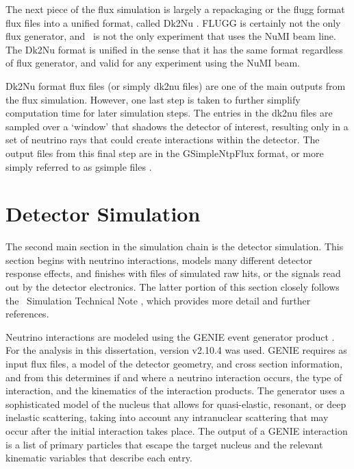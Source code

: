 The next piece of the flux simulation is largely a repackaging or the flugg format flux files into a unified format, called Dk2Nu \cite{ref:Dk2Nu}. FLUGG is certainly not the only flux generator, and \nova~is not the only experiment that uses the NuMI beam line. The Dk2Nu format is unified in the sense that it has the same format regardless of flux generator, and valid for any experiment using the NuMI beam.

Dk2Nu format flux files (or simply dk2nu files) are one of the main outputs from the flux simulation. However, one last step is taken to further simplify computation time for later simulation steps. The entries in the dk2nu files are sampled over a `window' that shadows the detector of interest, resulting only in a set of neutrino rays that could create interactions within the detector. The output files from this final step are in the GSimpleNtpFlux format, or more simply referred to as gsimple files \cite{ref:gsimple}.

\section{Detector Simulation}
\label{sec:SimDet}

The second main section in the simulation chain is the detector simulation. This section begins with neutrino interactions, models many different detector response effects, and finishes with files of simulated raw hits, or the signals read out by the detector electronics. The latter portion of this section closely follows the \nova~Simulation Technical Note \cite{ref:TNDetSim}, which provides more detail and further references.


Neutrino interactions are modeled using the GENIE event generator product \cite{ref:GENIEGen, ref:GENIE}. For the analysis in this dissertation, version v2.10.4 was used. GENIE requires as input flux files, a model of the detector geometry, and cross section information, and from this determines if and where a neutrino interaction occurs, the type of interaction, and the kinematics of the interaction products. The generator uses a sophisticated model of the nucleus that allows for quasi-elastic, resonant, or deep inelastic scattering, taking into account any intranuclear scattering that may occur after the initial interaction takes place. The output of a GENIE interaction is a list of primary particles that escape the target nucleus and the relevant kinematic variables that describe each entry.

